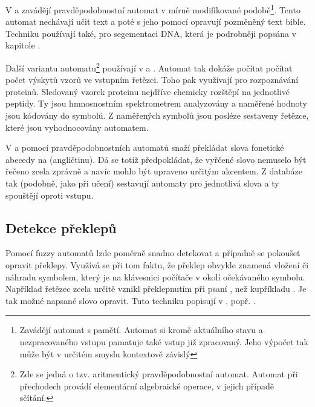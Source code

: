 \documentclass[a4paper,10pt]{article}
\begin{document}
V \cite{YorSinTis-PowAmnLeaPrAuVarMemLen} a \cite{Ron-AutLeaApp} zavádějí pravděpodobnostní automat v mírně modifikované podobě\footnote{Zavádějí automat s pamětí. Automat si kromě aktuálního stavu a nezpracovaného vstupu pamatuje také vstup již zpracovaný. Jeho výpočet tak může být v určitém smyslu kontextově závislý}. Tento automat nechávají učit text a poté s jeho pomocí opravují pozměněný text bible. Techniku používají také, pro segementaci DNA, která je podrobněji popsána v kapitole .

Další variantu automatu\footnote{Zde se jedná o tzv. aritmentický pravděpodobnostní automat. Automat při přechodech provádí elementární algebraické operace, v jejich případě sčítání.} používají v \cite{Mar+-ProAriAutApp} a \cite{Her-ProAriAutAppSoComFraBioSeqAna}. Automat tak dokáže počítat počítat počet výskytů vzorů ve vstupním řetězci. Toho pak využívají pro rozpoznávání proteinů. Sledovaný vzorek proteinu nejdříve chemicky rozštěpí na jednotlivé peptidy. Ty jsou hmnosnostním spektrometrem analyzovány a naměřené hodnoty jsou kódovány do symbolů. Z naměřených symbolů jsou posléze sestaveny řetězce, které jsou vyhodnocovány automatem.

V \cite{MohPerRoe-WeiFinStaTraSpeRec} a \cite{BahJel-DecChaWinDelSubApSpeRec} pomocí pravděpodobnostních automatů snaží překládat slova fonetické abecedy na  (angličtinu). Dá se totiž předpokládat, že vyřčené slovo nemuselo být řečeno zcela zprávně a navíc mohlo být upraveno určitým akcentem. Z databáze tak (podobně, jako při učení) sestavují automaty pro jednotlivá slova a ty spouštějí oproti vstupu.

\subsection{Detekce překlepů} \label{subs:DetTyp}
Pomocí fuzzy automatů lzde poměrně snadno detekovat a případně se pokoušet opravit překlepy. Využívá se při tom faktu, že překlep obvykle znamená vložení či náhradu symbolem, který je na klávesnici počítače v okolí očekávaného symbolu. Například řetězec  zcela určitě vznikl překlepnutím při psaní , než kupříkladu . Je tak možné napsané slovo opravit. Tuto techniku popisují v \cite{AndAbdAsm-ApprPattMatcFuzzLog}, popř. \cite{SnaKepAbrHas-AproxStriMatchFuzzAut}.%
\end{document}
